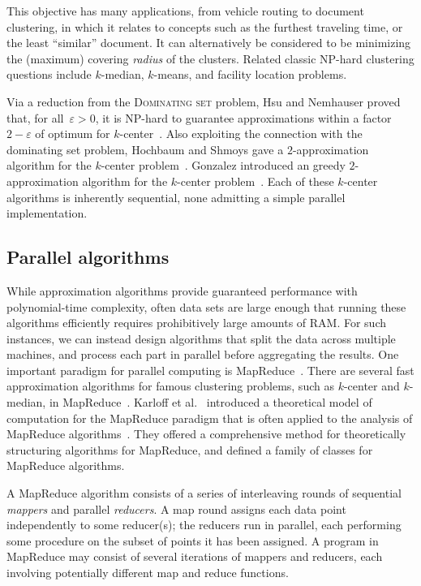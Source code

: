 \documentclass[11pt]{article}
\newcommand{\eps}{\ensuremath{\varepsilon}}
\begin{document}
This objective has many applications, from vehicle routing to document clustering, in which it relates to concepts such as the furthest traveling time, or the least ``similar'' document. 
It can alternatively be considered to be  minimizing the (maximum)
covering \emph{radius} of the clusters.
Related classic NP-hard clustering questions include
$k$-median, $k$-means, and facility location problems.

 Via a reduction from the \textsc{Dominating set} problem, 
 Hsu and Nemhauser proved that, for all~$\eps > 0$, it is NP-hard to guarantee approximations within a factor $2-\eps$ of optimum for $k$-center~\cite{hsu1979easy}. 
Also exploiting the connection with the dominating set problem, Hochbaum and Shmoys gave a $2$-approximation algorithm for the $k$-center problem~\cite{hochbaum1985best}.
Gonzalez introduced an greedy $2$-approximation algorithm for the $k$-center problem~\cite{gonzalez1985clustering}.
Each of these $k$-center algorithms is inherently sequential,
none admitting a simple parallel implementation. 

\subsection{Parallel algorithms}

While approximation algorithms provide guaranteed performance with 
polynomial-time complexity, often data sets are large enough that running
these algorithms efficiently requires prohibitively large amounts of RAM. 
For such instances, we can instead design algorithms that split the data across multiple machines, and process each part in parallel before aggregating the results. 
One important paradigm for parallel computing is
MapReduce~\cite{dean2008mapreduce}. 
There are several fast approximation algorithms for
famous clustering problems, such as $k$-center and $k$-median, in
MapReduce~\cite{blelloch2010parallel,chierichetti2010max,ene2011fast}.
Karloff et al.~\cite{karloff2010model} introduced a theoretical
model of computation for the MapReduce paradigm that is often applied
to the analysis of MapReduce algorithms~\cite{bahmani2012scalable,lattanzi2011filtering}.
They offered a comprehensive method for theoretically structuring algorithms for MapReduce,
and defined a family of classes for MapReduce algorithms.

A MapReduce algorithm consists of a series of interleaving rounds of sequential \emph{mappers} and parallel \emph{reducers}.
A map round assigns each data point independently to some reducer(s);
the reducers run in parallel, each performing some procedure
on the subset of points it has been assigned.
A program in MapReduce may consist of several iterations
of mappers and reducers, each involving potentially different map and reduce functions.
\end{document}
